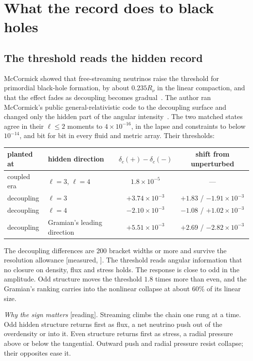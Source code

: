 \documentclass[11pt]{article}
\theoremstyle{definition}\newtheorem{hypothesis}{Hypothesis}\newtheorem{prediction}{Prediction}
\theoremstyle{remark}\newtheorem{remark}[theorem]{Remark}
\newcommand{\grade}[1]{\textsf{\small[#1]}}
\begin{document}
\section{What the record does to black holes}\label{sec:bh}

\subsection{The threshold reads the hidden record}
McCormick showed that free-streaming neutrinos raise the threshold for primordial black-hole formation, by about $0.235R_\nu$ in the linear compaction, and that the effect fades as decoupling becomes gradual~\cite{McC}. The author ran McCormick's public general-relativistic code to the decoupling surface and changed only the hidden part of the angular intensity~\cite{NU10}. The two matched states agree in their $\ell\le2$ moments to $4\times10^{-16}$, in the lapse and constraints to below $10^{-14}$, and bit for bit in every fluid and metric array. Their thresholds:
\begin{center}\begin{tabular}{llcc}\toprule
planted at & hidden direction & $\delta_c(+)-\delta_c(-)$ & shift from unperturbed\\\midrule
coupled era & $\ell=3$, $\ell=4$ & $1.8\times10^{-5}$ & ---\\
decoupling & $\ell=3$ & $+3.74\times10^{-3}$ & $+1.83$ / $-1.91\times10^{-3}$\\
decoupling & $\ell=4$ & $-2.10\times10^{-3}$ & $-1.08$ / $+1.02\times10^{-3}$\\
decoupling & Gramian's leading direction & $+5.51\times10^{-3}$ & $+2.69$ / $-2.82\times10^{-3}$\\\bottomrule\end{tabular}\end{center}
The decoupling differences are 200 bracket widths or more and survive the resolution allowance \grade{measured, \cite{NU10}}. The threshold reads angular information that no closure on density, flux and stress holds. The response is close to odd in the amplitude. Odd structure moves the threshold $1.8$ times more than even, and the Gramian's ranking carries into the nonlinear collapse at about $60\%$ of its linear size.

\emph{Why the sign matters} \grade{reading}. Streaming climbs the chain one rung at a time. Odd hidden structure returns first as flux, a net neutrino push out of the overdensity or into it. Even structure returns first as stress, a radial pressure above or below the tangential. Outward push and radial pressure resist collapse; their opposites ease it.
\end{document}

